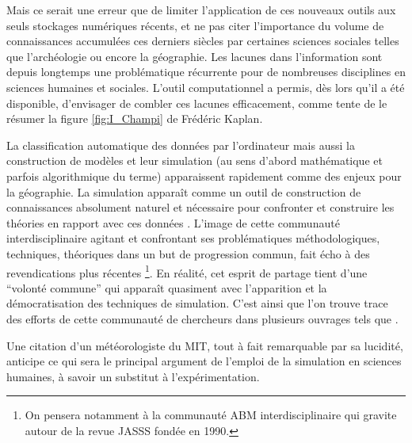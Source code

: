 Mais ce serait une erreur que de limiter l'application de ces nouveaux outils aux seuls stockages numériques récents, et ne pas citer l'importance du volume de connaissances accumulées ces derniers siècles par certaines sciences sociales telles que l'archéologie ou encore la géographie. Les lacunes dans l'information sont depuis longtemps une problématique récurrente pour de nombreuses disciplines en sciences humaines et sociales. L'outil computationnel a permis, dès lors qu'il a été disponible, d'envisager de combler ces lacunes efficacement, comme tente de le résumer la figure \ref{fig:I_Champi} de Frédéric Kaplan.


La classification automatique des données par l'ordinateur mais aussi la construction de modèles et leur simulation (au sens d'abord mathématique et parfois algorithmique du terme) apparaissent rapidement comme des enjeux pour la géographie. La simulation apparaît comme un outil de construction de connaissances absolument naturel et nécessaire pour confronter et construire les théories en rapport avec ces données \autocites{Kao1963, Hagerstrand1967b}. L'image de cette communauté interdisciplinaire agitant et confrontant ses problématiques méthodologiques, techniques, théoriques dans un but de progression commun, fait écho à des revendications plus récentes \footnote{On pensera notamment à la communauté ABM interdisciplinaire qui gravite autour de la revue JASSS fondée en  1990.}. En réalité, cet esprit de partage tient d'une \enquote{volonté commune} qui apparaît quasiment avec l'apparition et la démocratisation des techniques de simulation. C'est ainsi que l'on trouve trace des efforts de cette communauté de chercheurs dans plusieurs ouvrages tels que \autocites{Borko1962,Beshers1965,Naylor1966,Dutton1971,Guetzkow1962,Guetzkow1972}.

Une citation d'un météorologiste du MIT, tout à fait remarquable par sa lucidité, anticipe ce qui sera le principal argument de l'emploi de la simulation en sciences humaines, à savoir un substitut à l'expérimentation.

